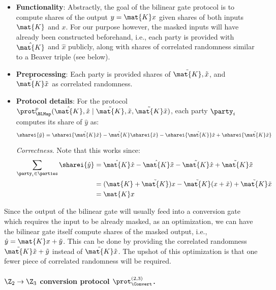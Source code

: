 \begin{itemize}
  \item \textbf{Functionality}: 
  Abstractly, the goal of the bilinear gate protocol is to compute shares of the output $y = \mat{K}x$ given shares of both inputs $\mat{K}$ and $x$. For our purpose however, the masked inputs will have already been constructed beforehand, i.e., each party is provided with $\hat{\mat{K}}$ and $\hat{x}$ publicly, along with shares of correlated randomness similar to a Beaver triple (see below).

  \item \textbf{Preprocessing}: Each party is provided shares of $\tilde{\mat{K}}, \tilde{x}$, and $\tilde{\mat{K}}\tilde{x}$ as correlated randomness.

  \item \textbf{Protocol details}: For the protocol $\prot_\BLMap^p(\hat{\mat{K}},\hat{x}\mid \tilde{\mat{K}}, \tilde{x}, \tilde{\mat{K}}\tilde{x})$, each party $\party_i$ computes its share of $\hat{y}$ as:
  \[
    \sharei{\hat{y}} = \sharei{\hat{\mat{K}}\hat{x}} - \hat{\mat{K}}\sharei{\tilde{x}} - \sharei{\tilde{\mat{K}}}\hat{x} + \sharei{\tilde{\mat{K}}\tilde{x}}
  \]

  \noindent \textit{Correctness}. Note that this works since:
  \begin{align*}
  \sum_{\party_i \in \parties} \sharei{\hat{y}} &= \hat{\mat{K}}\hat{x} - \hat{\mat{K}}\tilde{x} - \tilde{\mat{K}}\hat{x} + \tilde{\mat{K}}\tilde{x} \\
  &= (\mat{K} + \tilde{\mat{K}})x - \tilde{\mat{K}}(x + \tilde{x}) + \tilde{\mat{K}}\tilde{x} \\
  &= \mat{K}x
  \end{align*}
\end{itemize}
Since the output of the bilinear gate will usually feed into a conversion gate which requires the input to be already masked, as an optimization, we can have the bilinear gate itself compute shares of the masked output, i.e., $\hat{y} = \mat{K}x + \tilde{y}$. This can be done by providing the correlated randomness $\tilde{\mat{K}}\tilde{x} + \tilde{y}$ instead of $\tilde{\mat{K}}\tilde{x}$. The upshot of this optimization is that one fewer piece of correlated randomness will be required.
\fi
\paragraph{$\Z_2 \to \Z_3$ conversion protocol $\prot_\Convert^{(2,3)}$.}

